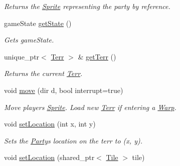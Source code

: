 \begin{DoxyCompactItemize}
\begin{DoxyCompactList}\small\item\em Returns the \hyperlink{class_sprite}{Sprite} representing the party by reference. \end{DoxyCompactList}\item 
game\+State \hyperlink{class_party_a3c0be11b35c62c1cc3c899b9c2ebd7d1}{get\+State} ()\hypertarget{class_party_a3c0be11b35c62c1cc3c899b9c2ebd7d1}{}\label{class_party_a3c0be11b35c62c1cc3c899b9c2ebd7d1}

\begin{DoxyCompactList}\small\item\em Gets game\+State. \end{DoxyCompactList}\item 
unique\+\_\+ptr$<$ \hyperlink{class_terr}{Terr} $>$ \& \hyperlink{class_party_adde2e05d8910f1882e112ddc74576a9e}{get\+Terr} ()\hypertarget{class_party_adde2e05d8910f1882e112ddc74576a9e}{}\label{class_party_adde2e05d8910f1882e112ddc74576a9e}

\begin{DoxyCompactList}\small\item\em Returns the current \hyperlink{class_terr}{Terr}. \end{DoxyCompactList}\item 
void \hyperlink{class_party_a729f2e7fd90ec533a9173a5468b046fa}{move} (dir d, bool interrupt=true)\hypertarget{class_party_a729f2e7fd90ec533a9173a5468b046fa}{}\label{class_party_a729f2e7fd90ec533a9173a5468b046fa}

\begin{DoxyCompactList}\small\item\em Move player\textquotesingle{}s \hyperlink{class_sprite}{Sprite}. Load new \hyperlink{class_terr}{Terr} if entering a \hyperlink{class_warp}{Warp}. \end{DoxyCompactList}\item 
void \hyperlink{class_party_a2efe239264b319d3b50e1a5957fcd859}{set\+Location} (int x, int y)\hypertarget{class_party_a2efe239264b319d3b50e1a5957fcd859}{}\label{class_party_a2efe239264b319d3b50e1a5957fcd859}

\begin{DoxyCompactList}\small\item\em Sets the \hyperlink{class_party}{Party}\textquotesingle{}s location on the terr to (x, y). \end{DoxyCompactList}\item 
void \hyperlink{class_party_aba5ff3d67efb8c61a9cfa8f6b3bbf7b3}{set\+Location} (shared\+\_\+ptr$<$ \hyperlink{class_tile}{Tile} $>$ tile)\hypertarget{class_party_aba5ff3d67efb8c61a9cfa8f6b3bbf7b3}{}\label{class_party_aba5ff3d67efb8c61a9cfa8f6b3bbf7b3}


\end{DoxyCompactItemize}
